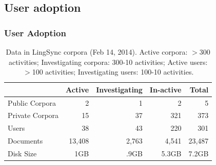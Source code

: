 \documentclass{beamer}
\begin{document}
\subsection{User adoption}

\begin{frame}
\frametitle{User Adoption}
\begin{table}[h]
\begin{center}
\scriptsize
\begin{tabular}{lrrrr}
      \toprule
                     ~ &  Active & Investigating & In-active & Total\\
      \midrule
      Public Corpora  &       2 &   1 &   2 & 5 \\ 
      Private Corpora &      15 &  37 & 321 & 373\\ 
      Users           &      38 &  43 & 220 & 301 \\
      Documents & 13,408 & 2,763 & 4,541 &23,487\\
      Disk Size & 1GB & .9GB & 5.3GB& 7.2GB\\
      
      \bottomrule

\end{tabular}
\caption{Data in LingSync corpora (Feb 14, 2014). Active corpora: $>$300
activities; Investigating corpora: 300-10 activities; Active users: $>$100
activities; Investigating users: 100-10 activities.}
\label{lingsync-data}
 \end{center}
 \normalsize
\end{table}

\end{frame}
\end{document}
